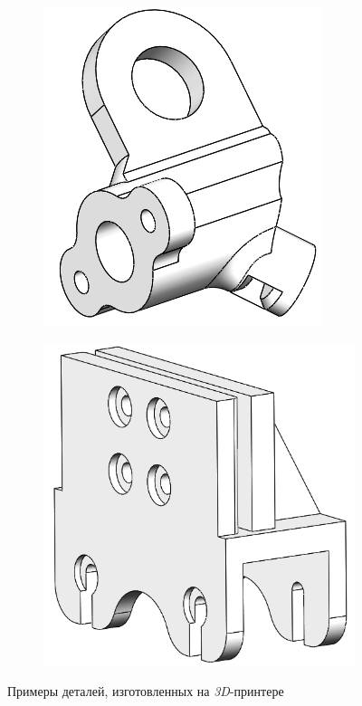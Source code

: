 \begin{figure}[ht]
    \centering
    \begin{subfigure}[b]{0.45\textwidth}    
        \centering
        \includegraphics[scale=0.55]{chapter_mechanics_construction/figure21.png}
        \caption{}
    \end{subfigure}
    \begin{subfigure}[b]{0.45\textwidth}
        \centering
        \includegraphics[scale=0.45]{chapter_mechanics_construction/figure22.png}
        \caption{}
    \end{subfigure}
     
    \caption{Примеры деталей, изготовленных на \textit{3D}-принтере}
    \label{}
\end{figure}

